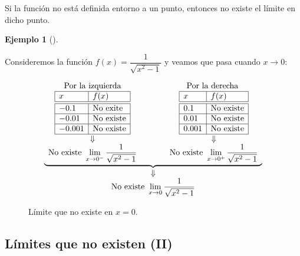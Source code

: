 \documentclass[
  a4paper,
]{scrreport}
\theoremstyle{definition}
\newtheorem{example}{Ejemplo}[chapter]
\theoremstyle{plain}
\theoremstyle{definition}
\theoremstyle{definition}
\theoremstyle{plain}
\theoremstyle{plain}
\theoremstyle{remark}
\begin{document}
Si la función no está definida entorno a un punto, entonces no existe el
límite en dicho punto.

\begin{example}[]\protect\hypertarget{exm-limites-no-existen}{}\label{exm-limites-no-existen}

Consideremos la función \(f(x)=\dfrac{1}{\sqrt{x^2-1}}\) y veamos que
pasa cuando \(x\to 0\):

\[
\begin{array}{c}
\underbrace{\begin{array}{ccc}
\mbox{Por la izquierda} & \qquad & \mbox{Por la derecha }\\
\begin{array}{|l|l|}
\hline
x      & f(x)   \\
\hline\hline
 -0.1   & \mbox{No exite}      \\
\hline
 -0.01   & \mbox{No existe}     \\
\hline
 -0.001  & \mbox{No existe}   \\
\hline
\end{array}
& &
\begin{array}{|l|l|}
\hline
x      & f(x)   \\
\hline\hline
 0.1    &  \mbox{No existe}      \\
\hline
 0.01   & \mbox{No existe}    \\
\hline
 0.001  & \mbox{No existe}   \\
\hline
\end{array}\\
\Downarrow & & \Downarrow\\
\displaystyle \mbox{No existe } \lim_{x\to 0^-}\frac{1}{\sqrt{x^2-1}}
& &
\displaystyle \mbox{No existe } \lim_{x\to 0^+}\frac{1}{\sqrt{x^2-1}}
\end{array}}\\
\Downarrow\\
\displaystyle \mbox{No existe }\lim_{x\to 0}\frac{1}{\sqrt{x^2-1}}
\end{array}\]

\begin{figure}
\centering

\caption{Límite que no existe en \(x=0\).}
\end{figure}

\end{example}

\subsection{Límites que no existen
(II)}\label{luxedmites-que-no-existen-ii}
\end{document}
